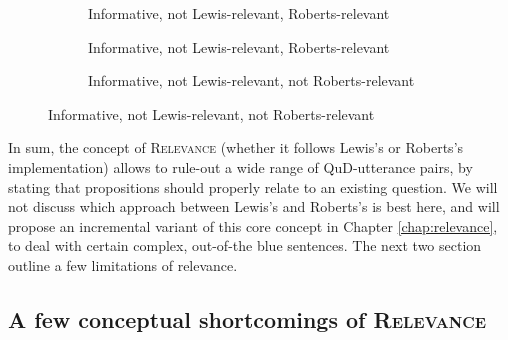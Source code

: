 \begin{figure}[H]\ContinuedFloat
	\begin{subfigure}[b]{.3\linewidth}
		\centering
		\caption{Informative, not Lewis-relevant, Roberts-relevant}\label{fig1:sub-cell-relevant}
	\end{subfigure}\hfill
	\begin{subfigure}[b]{.3\linewidth}
		\centering
		\caption{Informative, not Lewis-relevant, Roberts-relevant}\label{fig1:sub-1-cell-relevant}
	\end{subfigure}\hfill
	\begin{subfigure}[b]{.33\linewidth}
		\centering
		\caption{Informative, not Lewis-relevant, not Roberts-relevant}\label{fig1:not-relevant}
	\end{subfigure}
\end{figure}

In sum, the concept of \textsc{Relevance} (whether it follows Lewis's or Roberts's implementation) allows to rule-out a wide range of QuD-utterance pairs, by stating that propositions should properly relate to an existing question. We will not discuss which approach between Lewis's and Roberts's is best here, and will propose an incremental variant of this core concept in Chapter \ref{chap:relevance}, to deal with certain complex, out-of-the blue sentences. The next two section outline a few limitations of relevance.

\subsection{A few conceptual shortcomings of \textsc{Relevance}}

